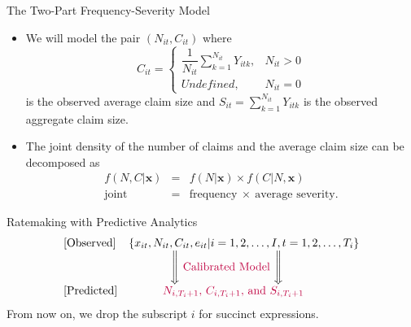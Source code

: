 \documentclass[ignorenonframetext,]{beamer}
\begin{document}
\begin{frame}{The Two-Part Frequency-Severity Model}
\begin{itemize}
	\item We will model the pair $(N_{it}, C_{it})$ where
	$$
	C_{it} = \begin{cases}
		\dfrac{1}{N_{it}} \sum\limits_{k=1}^{N_{it}} Y_{itk}, & N_{it} > 0 \\
		\textit{Undefined}, & N_{it} = 0
	\end{cases}
	$$
	is the observed average claim size and $S_{it}=\sum\limits_{k=1}^{N_{it}} Y_{itk}$ is the observed {\color{purple} aggregate claim size}.
	\item The joint density of the {\color{purple} number of claims} and the {\color{purple} average claim size} can be decomposed as
	\begin{eqnarray*}
		f(N,C|\mathbf{x}) &=& f(N|\mathbf{x}) \times f(C|N,\mathbf{x}) \\
		\text{joint} &=& \text{frequency} \ \times \ \text{average severity}.
	\end{eqnarray*}
\end{itemize}
\end{frame}

\begin{frame}{Ratemaking with Predictive Analytics}
\vfill
$$
\begin{array}{ll}
	\text{[Observed]} & \{x_{it}, N_{it}, C_{it}, e_{it} | i=1,2,\ldots,I, t=1,2,\ldots,T_i\} \\
	& \qquad\quad\ \ \Bigg\Downarrow \ \text{\color{purple}Calibrated Model} \ \Bigg\Downarrow \\
	\text{[Predicted]} & \qquad\quad {\color{purple} N_{i,T_i+1},\, C_{i,T_i+1},\, \text{and } S_{i,T_i+1}}
\end{array}
$$
\pause
From now on, we drop the subscript $i$ for succinct expressions.
\vfill
\vfill
\end{frame}
\end{document}
